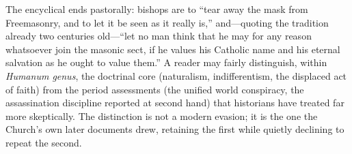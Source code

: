 The encyclical ends pastorally: bishops are to ``tear away the mask from Freemasonry, and to let it be seen as it really is,'' and---quoting the tradition already two centuries old---``let no man think that he may for any reason whatsoever join the masonic sect, if he values his Catholic name and his eternal salvation as he ought to value them.'' A reader may fairly distinguish, within \emph{Humanum genus}, the doctrinal core (naturalism, indifferentism, the displaced act of faith) from the period assessments (the unified world conspiracy, the assassination discipline reported at second hand) that historians have treated far more skeptically. The distinction is not a modern evasion; it is the one the Church's own later documents drew, retaining the first while quietly declining to repeat the second.
